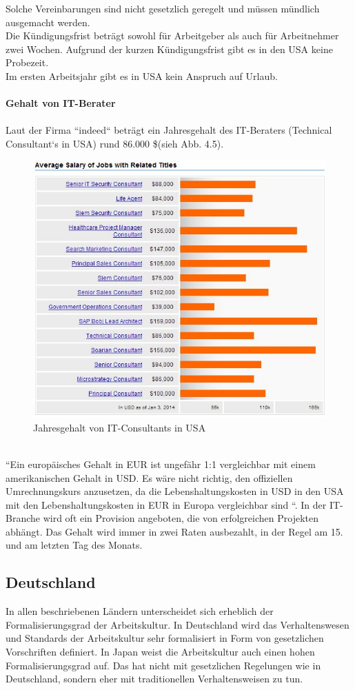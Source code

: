 		Solche Vereinbarungen sind nicht gesetzlich geregelt und müssen mündlich ausgemacht werden.\\
		Die Kündigungsfrist beträgt sowohl für Arbeitgeber als auch für 
		Arbeitnehmer zwei Wochen. Aufgrund der kurzen Kündigungsfrist gibt es in den USA keine Probezeit.\\
		Im ersten Arbeitsjahr gibt es in USA kein Anspruch auf Urlaub.
		\\
		\\
	\textbf{Gehalt von IT-Berater}\\
		\\
		Laut der Firma ``indeed`` beträgt ein Jahresgehalt des IT-Beraters (Technical Consultant`s in USA) rund 86.000 \$(sieh Abb. 4.5).
		\begin{figure}[ht]
				\centering
				\includegraphics[width=0.7\linewidth]{./images/Techn_Cons_Sal}
				\caption{Jahresgehalt von IT-Consultants in USA}
				\label{fig:TechConsSal}
				\end{figure}\\
		``Ein europäisches Gehalt in EUR ist ungefähr 1:1 vergleichbar mit einem 
		amerikanischen Gehalt in USD. Es wäre nicht richtig, den offiziellen Umrechnungskurs anzusetzen, da die Lebenshaltungskosten in USD in den USA mit den Lebenshaltungskosten in EUR in Europa vergleichbar sind	``. In der IT-Branche wird oft ein Provision angeboten, die von erfolgreichen 
		Projekten abhängt. Das Gehalt wird immer in zwei Raten ausbezahlt, in der Regel am 15. und am letzten Tag des Monats. 
		

	\subsection{Deutschland}
	In allen beschriebenen Ländern unterscheidet sich erheblich der Formalisierungsgrad der Arbeitskultur. In Deutschland wird das Verhaltenswesen und Standards der Arbeitskultur sehr formalisiert in Form von gesetzlichen Vorschriften definiert. In Japan weist die Arbeitskultur auch einen hohen Formalisierungsgrad auf. Das hat nicht mit gesetzlichen Regelungen wie in Deutschland, sondern eher mit traditionellen Verhaltensweisen zu tun.
	
